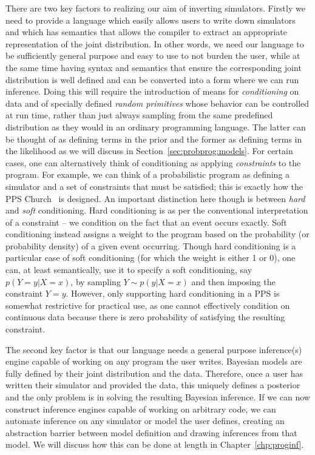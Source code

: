 There are two key factors to realizing our aim of inverting simulators.  Firstly we need to provide a 
language which easily allows users to
write down simulators and which has semantics that allows the compiler to extract an appropriate
representation of the joint distribution.  In other words, we need our language to be sufficiently
general purpose and easy to use to not burden the user, while at the same time having syntax and semantics that
ensure the corresponding joint distribution is well defined and can be converted into a form where
we can run inference.  Doing this will require the introduction of means for \emph{conditioning} on data
and of specially defined \emph{random primitives} whose behavior can be controlled at 
run time, rather than just always sampling from
the same predefined distribution as they would in an ordinary programming language.  
The latter can be thought of as defining terms in the prior and the
former as defining terms in the likelihood as we will discuss in Section~\ref{sec:probprog:models}.
For certain cases, one can alternatively think of conditioning as applying \emph{constraints} to the
program.  For example, we can think of a probabilistic program as defining a simulator
and a set of constraints that must be satisfied; this is exactly
how the PPS Church~\citep{goodman2008church} is designed.  An important distinction 
here though is between \emph{hard} and \emph{soft} conditioning.  Hard conditioning is as per the conventional
interpretation of a constraint -- we condition on the fact that an event occurs exactly.  Soft conditioning instead
assigns a weight to the program based on the probability (or probability density) of a given event occurring.
Though hard conditioning is a particular case of soft conditioning (for which the weight is either 1 or 0),
one can, at least semantically, use it to specify a soft conditioning, say 
$p(Y=y | X=x)$, by sampling $Y\sim p(y|X=x)$ and then imposing the constraint $Y=y$.
However, only supporting hard conditioning in a PPS is somewhat restrictive for practical
use, as one cannot effectively condition on continuous data because there is zero probability of
satisfying the resulting constraint.

The second key factor is that our language needs a general purpose inference(s)
engine capable of working on any program the user writes.  Bayesian models are fully defined
by their joint distribution and the data.  Therefore, once a user has written their simulator and provided
the data, this uniquely defines a posterior and the only problem is in solving the resulting Bayesian inference.
If we can now construct inference engines capable of working on arbitrary code, we can 
automate inference on any simulator or model the user defines, creating an
abstraction barrier between model definition and drawing inferences from that model.  We will discuss how this can be
done at length in Chapter~\ref{chp:proginf}.

